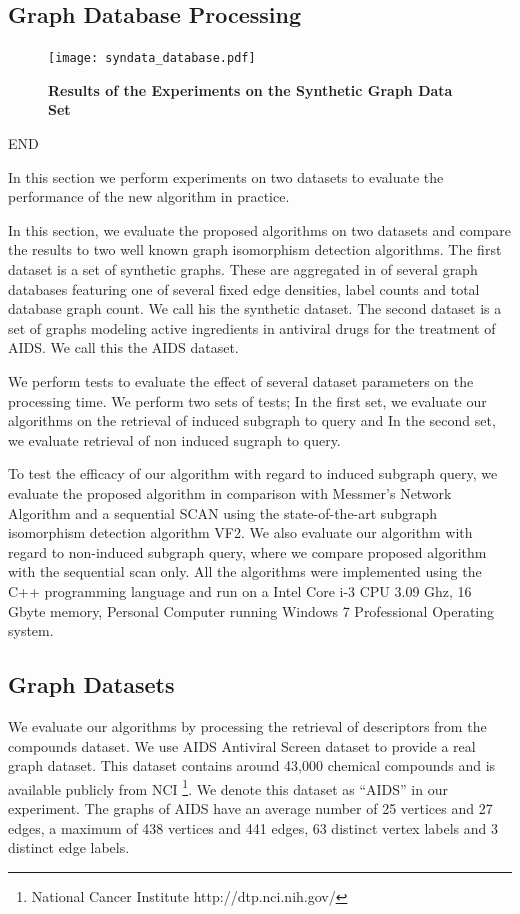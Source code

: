 \subsection{Graph Database Processing}

\begin{figure}[H]
\centering
\texttt{[image: syndata\_database.pdf]}
\caption{\textbf{Results of the Experiments on the Synthetic Graph Data Set}}
\label{fig:database}
\end{figure}

END

In this section we perform experiments on two datasets to evaluate the performance of the new algorithm in practice.

In this section, we evaluate the proposed algorithms on two datasets and compare the results to two well known graph isomorphism detection algorithms. The first dataset is a set of synthetic graphs. These are aggregated in of several graph databases featuring one of several fixed edge densities, label counts and total database graph count. We call his the synthetic dataset. The second dataset is  a set of graphs modeling active ingredients in antiviral drugs for the treatment of AIDS. We call this the AIDS dataset. 

We perform tests to evaluate the effect of several dataset parameters on the processing time.
We perform two sets of tests; In the first set, we evaluate our algorithms on the retrieval of induced subgraph to query and In the second set, we evaluate retrieval of non induced sugraph to query.

To test the efficacy of our algorithm with regard to induced subgraph query, we evaluate the proposed algorithm in comparison with Messmer's Network Algorithm and a sequential SCAN using the state-of-the-art subgraph isomorphism detection algorithm VF2\cite{cordella2001_vf2}.
We also evaluate our algorithm with regard to non-induced subgraph query, where we compare proposed algorithm with the sequential scan only.
All the algorithms were implemented using the C++ programming language and run on a Intel Core i-3 CPU 3.09 Ghz, 16 Gbyte memory, Personal Computer running Windows 7 Professional Operating system.

\subsection{Graph Datasets}
We evaluate our algorithms by processing the retrieval of descriptors from the compounds dataset.
We use AIDS Antiviral Screen dataset to provide a real graph dataset.
This dataset contains around 43,000 chemical compounds and is available publicly from NCI
\footnote{National Cancer Institute http://dtp.nci.nih.gov/}.
We denote this dataset as ``AIDS'' in our experiment.
The graphs of AIDS have an average number of 25 vertices and 27 edges, a maximum of 438 vertices and 441 edges,
63 distinct vertex labels and 3 distinct edge labels.

